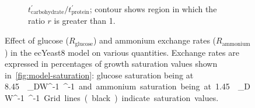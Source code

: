 \begin{figure}
\begin{subfigure}[t]{0.45\textwidth}
    \caption{
      $t_{\mathrm{carbohydrate}}^{\prime}/t_{\mathrm{protein}}^{\prime}$;
      contour shows region in which the ratio $r$ is greater than 1.
    }
    \label{fig:model-grid-glc-carb-to-prot}
  \end{subfigure}
  \caption{
    Effect of glucose ($R_{\mathrm{glucose}}$) and ammonium exchange rates ($R_{{\mathrm{ammonium}}}$) in the ecYeast8 model on various quantities.
    Exchange rates are expressed in percentages of growth saturation values shown in~\ref{fig:model-saturation}: glucose saturation being at \SI{8.45}{\milli\mole~\gram_{DW}^{-1}~\hour^{-1}} and ammonium saturation being at \SI{1.45}{\milli\mole~\gram_{DW}^{-1}~\hour^{-1}}.
    Grid lines (black) indicate saturation values.
  }
  \label{fig:model-grid-glc}
\end{figure}


